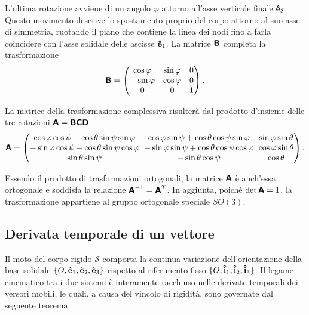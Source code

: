 L'ultima rotazione avviene di un angolo $\varphi$ attorno all'asse verticale finale $\vu{e}_3$. Questo movimento descrive lo spostamento proprio del corpo attorno al suo asse di simmetria, ruotando il piano che contiene la linea dei nodi fino a farla coincidere con l'asse solidale delle ascisse $\vu{e}_1$. La matrice $\boldsymbol{\mathsf{B}}$ completa la trasformazione
\begin{equation*}
    \boldsymbol{\mathsf{B}} = \begin{pmatrix} 
        \cos\varphi & \sin\varphi & 0 \\ 
        -\sin\varphi & \cos\varphi & 0 \\ 
        0 & 0 & 1 
    \end{pmatrix}.
\end{equation*}

La matrice della trasformazione complessiva risulterà dal prodotto d'insieme delle tre rotazioni $\boldsymbol{\mathsf{A}} = \boldsymbol{\mathsf{B}}\boldsymbol{\mathsf{C}}\boldsymbol{\mathsf{D}}$
{\small
\begin{equation} \label{eq:matriceEulero}
    \setlength{\arraycolsep}{3pt}
    \tens{A} = \begin{pmatrix} 
        \cos\varphi\cos\psi - \cos\theta\sin\psi\sin\varphi & \cos\varphi\sin\psi + \cos\theta\cos\psi\sin\varphi & \sin\varphi\sin\theta \\ 
        -\sin\varphi\cos\psi - \cos\theta\sin\psi\cos\varphi & -\sin\varphi\sin\psi + \cos\theta\cos\psi\cos\varphi & \cos\varphi\sin\theta \\ 
        \sin\theta\sin\psi & -\sin\theta\cos\psi & \cos\theta 
    \end{pmatrix}.
\end{equation}
}

Essendo il prodotto di trasformazioni ortogonali, la matrice $\boldsymbol{\mathsf{A}}$ è anch'essa ortogonale e soddisfa la relazione $\boldsymbol{\mathsf{A}}^{-1} = \boldsymbol{\mathsf{A}}^T$. In aggiunta, poiché $\det\boldsymbol{\mathsf{A}} = 1$, la trasformazione appartiene al gruppo ortogonale speciale $SO(3)$.

\subsection{Derivata temporale di un vettore}

Il moto del corpo rigido $\mathcal{S}$ comporta la continua variazione dell'orientazione della base solidale $\{O, \vu{e}_1, \vu{e}_2, \vu{e}_3\}$ rispetto al riferimento fisso $\{O, \vu{i}_1, \vu{i}_2, \vu{i}_3\}$. Il legame cinematico tra i due sistemi è interamente racchiuso nelle derivate temporali dei versori mobili, le quali, a causa del vincolo di rigidità, sono governate dal seguente teorema.

